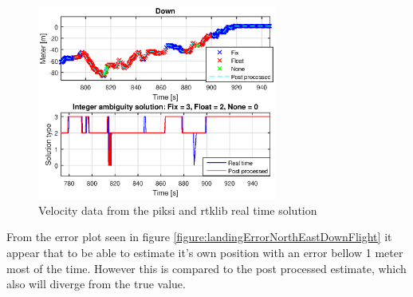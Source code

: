 \begin{figure}[H]
	\centering
		\includegraphics[width=0.7\textwidth]{figs/plots/landingDownFlight.eps}
		\caption{Velocity data from the piksi and rtklib real time solution}
		\label{figure:landingDownFlight}
\end{figure}

From the error plot seen in figure \ref{figure:landingErrorNorthEastDownFlight} it appear that to be able to estimate it's own position with an error bellow 1 meter most of the time. However this is compared to the post processed estimate, which also will diverge from the true value.

